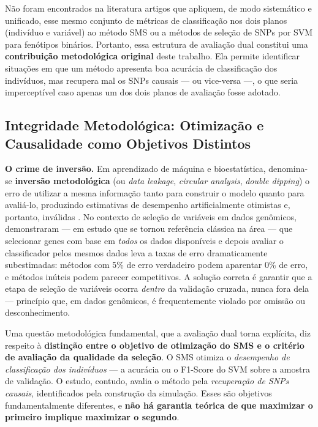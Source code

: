\documentclass[
    12pt,
    a4paper,
    oneside,
    english,
    french,
    spanish,
    brazil
    ]{abntex2}
\newcommand{\novo}[1]{\textcolor{corNova}{#1}}
\begin{document}
\novo{Não foram encontrados na literatura artigos que apliquem, de modo sistemático e unificado, esse mesmo conjunto de métricas de classificação nos dois planos (indivíduo e variável) ao método SMS ou a métodos de seleção de SNPs por SVM para fenótipos binários. Portanto, essa estrutura de avaliação dual constitui uma \textbf{contribuição metodológica original} deste trabalho. Ela permite identificar situações em que um método apresenta boa acurácia de classificação dos indivíduos, mas recupera mal os SNPs causais --- ou vice-versa ---, o que seria imperceptível caso apenas um dos dois planos de avaliação fosse adotado.}

\subsection*{Integridade Metodológica: Otimização e Causalidade como Objetivos Distintos}

\novo{\textbf{O crime de inversão.} Em aprendizado de máquina e bioestatística, denomina-se \textbf{inversão metodológica} (ou \textit{data leakage}, \textit{circular analysis}, \textit{double dipping}) o erro de utilizar a mesma informação tanto para construir o modelo quanto para avaliá-lo, produzindo estimativas de desempenho artificialmente otimistas e, portanto, inválidas \cite{hastie2009elements}. No contexto de seleção de variáveis em dados genômicos, \citeonline{ambroise2002selection} demonstraram --- em estudo que se tornou referência clássica na área --- que selecionar genes com base em \emph{todos} os dados disponíveis e depois avaliar o classificador pelos mesmos dados leva a taxas de erro dramaticamente subestimadas: métodos com 5\% de erro verdadeiro podem aparentar 0\% de erro, e métodos inúteis podem parecer competitivos. A solução correta é garantir que a etapa de seleção de variáveis ocorra \emph{dentro} da validação cruzada, nunca fora dela --- princípio que, em dados genômicos, é frequentemente violado por omissão ou desconhecimento.}

\novo{Uma questão metodológica fundamental, que a avaliação dual torna explícita, diz respeito à \textbf{distinção entre o objetivo de otimização do SMS e o critério de avaliação da qualidade da seleção}. O SMS otimiza o \emph{desempenho de classificação dos indivíduos} --- a acurácia ou o F1-Score do SVM sobre a amostra de validação. O estudo, contudo, avalia o método pela \emph{recuperação de SNPs causais}, identificados pela construção da simulação. Esses são objetivos fundamentalmente diferentes, e \textbf{não há garantia teórica de que maximizar o primeiro implique maximizar o segundo}.}
\end{document}
